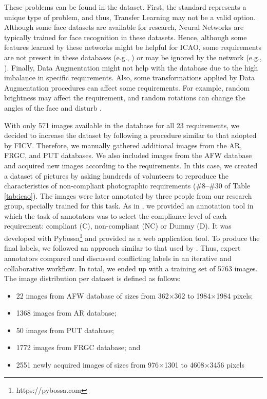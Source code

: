 These problems can be found in the \ficvtest dataset. First, the \icao standard represents a unique type of problem, and thus, Transfer Learning may not be a valid option. Although some face datasets are available for research, Neural Networks are typically trained for face recognition in these datasets. Hence, although some features learned by these networks might be helpful for ICAO, some requirements are not present in these databases (e.g., \inkmarked) or may be ignored by the network (e.g., \variedbackground). Finally, Data Augmentation might not help with the \ficvtest database due to the high imbalance in specific requirements. Also, some transformations applied by Data Augmentation procedures can affect some requirements. For example, random brightness may affect the \toodarklight requirement, and random rotations can change the angles of the face and disturb \rollpitchyaw.
 
With only 571 images available in the \ficvtest database for all 23 requirements, we decided to increase the dataset by following a procedure similar to that adopted by FICV. Therefore, we manually gathered additional images from the AR, FRGC, and PUT databases. We also included images from the AFW database \citep{databaseAFW} and acquired new images according to the \icao requirements. In this case, we created a dataset of pictures by asking hundreds of volunteers to reproduce the characteristics of non-compliant photographic requirements (\#8--\#30 of Table \ref{tab:icao}). The images were later annotated by three people from our research group, specially trained for this task. As in \citep{Nowak2010}, we provided an annotation tool in which the task of annotators was to select the compliance level of each requirement: compliant (C), non-compliant (NC) or Dummy (D). It was developed with Pybossa\footnote{https://pybossa.com} and provided as a web application tool. To produce the final labels, we followed an approach similar to that used by \citep{Chang2017}. Thus, expert annotators compared and discussed conflicting labels in an iterative and collaborative workflow. In total, we ended up with a training set of 5763 images. The image distribution per dataset is defined as follows:
 
\begin{itemize}
\item 22 images from AFW database of sizes from 362$\times$362 to 1984$\times$1984 pixels;
\item 1368 images from AR database;
\item 50 images from PUT database;
\item 1772 images from FRGC database; and
\item 2551 newly acquired images of sizes from 976$\times$1301 to 4608$\times$3456 pixels
\end{itemize}
 
